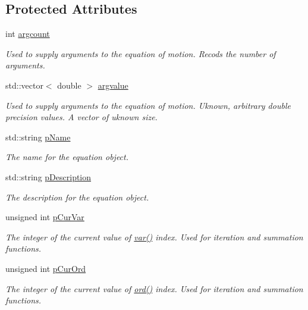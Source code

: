 \subsection*{Protected Attributes}
\begin{DoxyCompactItemize}
\item 
int \hyperlink{classosea_1_1ofreq_1_1_equationof_motion_a13a15811fd575ac0fccf0d463218657b}{argcount}
\begin{DoxyCompactList}\small\item\em Used to supply arguments to the equation of motion. Recods the number of arguments. \end{DoxyCompactList}\item 
std\-::vector$<$ double $>$ \hyperlink{classosea_1_1ofreq_1_1_equationof_motion_a1a9bf7f3460368c102aa8d4edec9b500}{argvalue}
\begin{DoxyCompactList}\small\item\em Used to supply arguments to the equation of motion. Uknown, arbitrary double precision values. A vector of uknown size. \end{DoxyCompactList}\item 
std\-::string \hyperlink{classosea_1_1ofreq_1_1_equationof_motion_a5848a1ad14d31556fd1b62b4e3de3643}{p\-Name}
\begin{DoxyCompactList}\small\item\em The name for the equation object. \end{DoxyCompactList}\item 
std\-::string \hyperlink{classosea_1_1ofreq_1_1_equationof_motion_aa6ce10dacd47441d445a9170bd355792}{p\-Description}
\begin{DoxyCompactList}\small\item\em The description for the equation object. \end{DoxyCompactList}\item 
unsigned int \hyperlink{classosea_1_1ofreq_1_1_equationof_motion_a88a53c5688c07a1cb90cdf5755782fcf}{p\-Cur\-Var}
\begin{DoxyCompactList}\small\item\em The integer of the current value of \hyperlink{classosea_1_1ofreq_1_1_equationof_motion_ab69511cc5037376cf7da80ce30d9eaab}{var()} index. Used for iteration and summation functions. \end{DoxyCompactList}\item 
unsigned int \hyperlink{classosea_1_1ofreq_1_1_equationof_motion_a39d41e27dcf84f163ef794a9287a0ef1}{p\-Cur\-Ord}
\begin{DoxyCompactList}\small\item\em The integer of the current value of \hyperlink{classosea_1_1ofreq_1_1_equationof_motion_a31f904818ce75c9e2a2b5cff9fc707a5}{ord()} index. Used for iteration and summation functions. \end{DoxyCompactList}\item 

\end{DoxyCompactItemize}
